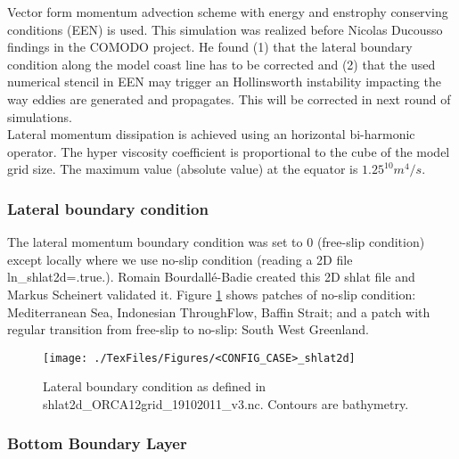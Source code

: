 Vector form momentum advection scheme with energy and enstrophy conserving conditions (EEN) is used. This simulation
was realized before Nicolas Ducousso findings in the COMODO project. He found (1) that the lateral boundary condition along
the model coast line has to be corrected  and (2) that the used numerical stencil in EEN may trigger an Hollinsworth instability
impacting the way eddies are generated and propagates. This will be corrected in next round of simulations. \\

Lateral momentum dissipation is achieved using an horizontal bi-harmonic operator. The hyper viscosity coefficient is proportional
to the cube of the model grid size. The maximum value (absolute value) at the equator is  $1.25^{10} m^4/s$.


\subsubsection{Lateral boundary condition}

The lateral momentum boundary condition was set to 0 (free-slip condition) except locally where we use no-slip condition (reading a 2D file ln\_shlat2d=.true.). 
Romain Bourdall\'e-Badie created this 2D shlat file and Markus Scheinert validated it.
Figure \ref{shlat_v3} shows patches of no-slip condition: Mediterranean Sea, Indonesian ThroughFlow, 
Baffin Strait; and a patch with regular transition from free-slip to no-slip: South West Greenland.


\begin{figure}[H]
\begin{center}
\texttt{[image: ./TexFiles/Figures/<CONFIG\_CASE>\_shlat2d]}
\caption{Lateral boundary condition as defined in shlat2d\_ORCA12grid\_19102011\_v3.nc. Contours are bathymetry.}
\label{shlat_v3}
\end{center}
\end{figure}

\subsubsection{Bottom Boundary Layer}

